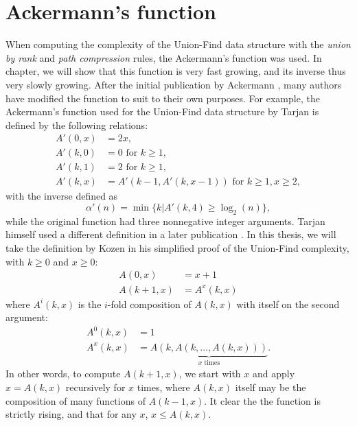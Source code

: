 \chapter{Ackermann's function}\label{ap:ackermann}
When computing the complexity of the Union-Find data structure \cite{tarjan1975efficiency} with the \emph{union by rank} and \emph{path compression} rules, the Ackermann's function was used. In chapter, we will show that this function is very fast growing, and its inverse thus very slowly growing. After the initial publication by Ackermann \cite{ackermann1928hilbertschen}, many authors have modified the function to suit to their own purposes. For example, the Ackermann's function used for the Union-Find data structure by Tarjan \cite{tarjan1975efficiency} is defined by the following relations:
\begin{align*}
    A'(0,x) &= 2x, \\
    A'(k,0) &= 0 \text{ for } k \geq 1, \\
    A'(k,1) &= 2 \text{ for } k \geq 1, \\
    A'(k,x) &= A'(k-1, A'(k, x-1)) \text{ for } k \geq 1, x \geq 2,
\end{align*}
with the inverse defined as
\begin{equation*}
    \alpha'(n) = \min \{k | A'(k,4) \geq \log_2(n)\}, 
\end{equation*}
while the original function had three nonnegative integer arguments. Tarjan himself used a different definition in a later publication \cite{tarjan1984worst}. In this thesis, we will take the definition by Kozen \cite{kozen1992design} in his simplified proof of the Union-Find complexity, with $k\geq 0$ and $x\geq 0$:
\begin{align}
    \nonumber A(0,x) &= x + 1\\
    A(k+1,x) &= A^x(k,x)
\end{align}
where $A^i(k,x)$ is the $i$-fold composition of $A(k,x)$ with itself on the second argument:
\begin{align}
    \nonumber  A^0(k,x) &= 1 \\
    A^x(k,x) &= \underbrace{A(k, A(k, ..., A(k,x)))}_{x \text{ times}}.
\end{align}
In other words, to compute $A(k+1,x)$, we start with $x$ and apply $x=A(k,x)$ recursively for $x$ times, where $A(k,x)$ itself may be the composition of many functions of $A(k-1,x)$. It clear the the function is strictly rising, and that for any $x$, $x\leq A(k,x)$. 

